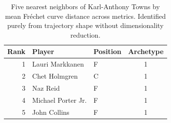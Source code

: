 \begin{table}[htbp]
  \centering\small
  \begin{tabular}{rllc}
    \toprule
    Rank & Player & Position & Archetype \\
    \midrule
    1 & Lauri Markkanen & F & 1 \\
    2 & Chet Holmgren & C & 1 \\
    3 & Naz Reid & F & 1 \\
    4 & Michael Porter Jr. & F & 1 \\
    5 & John Collins & F & 1 \\
    \bottomrule
  \end{tabular}
  \caption{Five nearest neighbors of Karl-Anthony Towns by mean Fr\'{e}chet curve distance across metrics. Identified purely from trajectory shape without dimensionality reduction.}
  \label{tab:Karl_Anthony_Towns_frechet_curve_neighbors}
\end{table}


